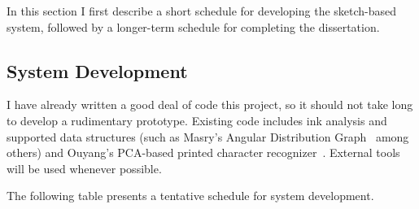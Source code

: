 \documentclass[11pt]{article}
\begin{document}
In this section I first describe a short schedule for developing the
sketch-based system, followed by a longer-term schedule for completing
the dissertation. 

\subsection{System Development}
\label{sec:system-development-schedule}

I have already written a good deal of code this project, so it should
not take long to develop a rudimentary prototype. Existing code
includes ink analysis and supported data structures (such as Masry's
Angular Distribution Graph~\cite{masry-3d-sketch} among others) and
Ouyang's PCA-based printed character
recognizer~\cite{ouyang-visual-recog}. External tools will be used
whenever possible.

The following table presents a tentative schedule for system development.
\end{document}

